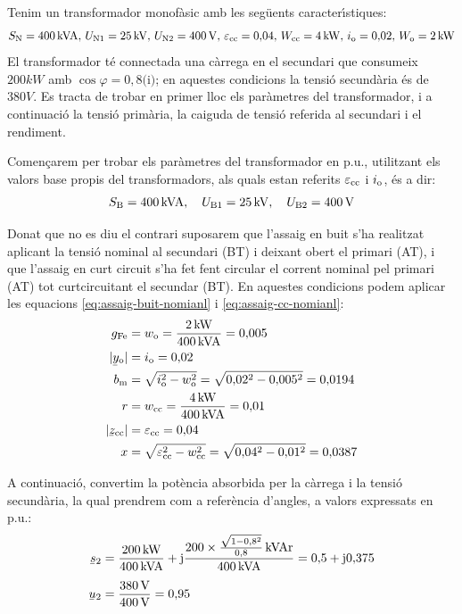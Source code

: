 \begin{exemple}
    Tenim un transformador monof\`{a}sic amb les seg\"{u}ents caracter\'{\i}stiques:
    \[S_\mathrm{N}=400\mathrm{\,kVA},\,U_\mathrm{N1}=25\mathrm{\,kV},\, U_\mathrm{N2}=400\mathrm{\,V},\, \varepsilon_\mathrm{cc}=0{,}04,\, W_\mathrm{cc}=4\mathrm{\,kW},\, i_\mathrm{o}=0{,}02,\,  W_\mathrm{o}=2\mathrm{\,kW}\]
     El transformador t\'{e} connectada una c\`{a}rrega en el secundari que consumeix $200\unit{kW}$ amb $\cos{\varphi}=0{,}8\text{(i)}$; en aquestes condicions la tensi\'{o} secund\`{a}ria \'{e}s de $380\unit{V}$.
    Es tracta de trobar en primer lloc els par\`{a}metres del transformador, i a continuaci\'{o} la tensi\'{o} prim\`{a}ria, la caiguda de tensi\'{o} referida al secundari i el rendiment.

    Comen\c{c}arem per trobar els par\`{a}metres del transformador en p.u., utilitzant els valors base propis del transformadors, als quals estan referits $\varepsilon_\mathrm{cc}$ i $i_\mathrm{o}$, \'{e}s a dir:
    \[ S_\mathrm{B}=400\mathrm{\,kVA},\quad U_\mathrm{B1}=25\mathrm{\,kV},\quad U_\mathrm{B2}=400\mathrm{\,V}\]

    Donat que no es diu el contrari suposarem que l'assaig en buit s'ha realitzat aplicant la tensi\'{o} nominal al secundari (BT) i deixant obert el primari (AT), i que l'assaig en curt circuit s'ha fet fent circular el corrent nominal pel primari (AT) tot curtcircuitant el secundar (BT). En aquestes condicions podem aplicar les equacions \eqref{eq:assaig-buit-nomianl} i \eqref{eq:assaig-cc-nomianl}:
   \begin{align*}
        g\ped{Fe} &= w\ped{o} = \frac{2\unit{kW}}{400\unit{kVA}} = 0{,}005 \\
        |\cmplx{y}\ped{o}| &= i\ped{o}  = 0{,}02 \\
        b\ped{m} &= \sqrt{i\ped{o}^2 - w\ped{o}^2} = \sqrt{0{,}02^2 - 0{,}005^2} = 0{,}0194\\
        r &= w\ped{cc} = \frac{4\unit{kW}}{400\unit{kVA}} = 0{,}01 \\
        |\cmplx{z}\ped{cc}| &=  \varepsilon\ped{cc} = 0{,}04 \\
        x &= \sqrt{\varepsilon\ped{cc}^2 - w\ped{cc}^2} = \sqrt{0{,}04^2-0{,}01^2} = 0{,}0387
  \end{align*}

        A continuaci\'{o}, convertim la pot\`{e}ncia absorbida per la c\`{a}rrega i la tensi\'{o} secund\`{a}ria, la qual prendrem com a refer\`{e}ncia d'angles,  a valors expressats en p.u.:
  \begin{align*}
    \cmplx{s}_2 &= \frac{200\unit{kW}}{400\unit{kVA}} + \ju \frac{200\times \frac{\sqrt{1-0{,}8^2}}{0{,}8}\unit{kVAr}}{400\unit{kVA}} = 0{,}5 + \ju 0{,}375\\[1ex]
    \cmplx{u}_2 &= \frac{380\unit{V}}{400\unit{V}} = 0{,}95
  \end{align*}


\end{exemple}
